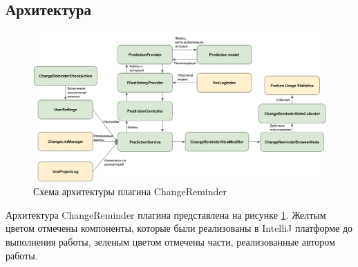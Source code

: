 \subsection{Архитектура}
\begin{figure}[!h]
\caption{Схема архитектуры плагина ChangeReminder}\label{ChangeReminder-arch}
\centering
\includegraphics[scale=0.36]{images/ChangeReminderArch.png}
\end{figure}
Архитектура ChangeReminder плагина представлена на рисунке \ref{ChangeReminder-arch}. Желтым цветом отмечены компоненты, которые были реализованы в IntelliJ платформе до выполнения работы, зеленым цветом отмечены части, реализованные автором работы.\\

